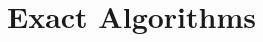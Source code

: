 \clearpage{\pagestyle{plain}\cleardoublepage} 
\chapter{Exact Algorithms} 
\label{chapter:exact} 




